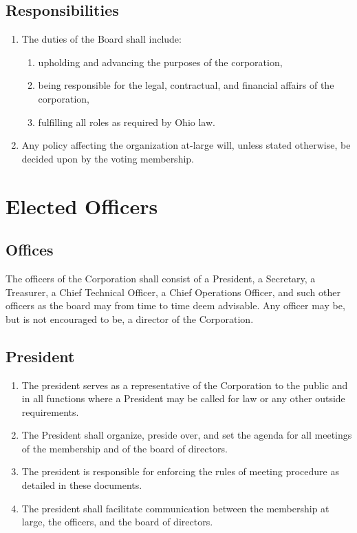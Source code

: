 \documentclass{article}
\begin{document}
\subsection{Responsibilities}
\begin{enumerate}
  \item The duties of the Board shall include:
  \begin{enumerate}
    \item upholding and advancing the purposes of the corporation,
    \item being responsible for the legal, contractual, and financial affairs of
    the corporation,
    \item fulfilling all roles as required by Ohio law.
  \end{enumerate}
  \item Any policy affecting the organization at-large will, unless stated
  otherwise, be decided upon by the voting membership.
\end{enumerate}
\section{Elected Officers}
\subsection{Offices}
The officers of the Corporation shall consist of a President, a Secretary, a Treasurer, a 
Chief Technical Officer, a Chief Operations Officer, and such other officers as the board 
may from time to time deem advisable.  Any officer may be, but is not encouraged to be, a 
director of the Corporation.
\subsection{President}
\begin{enumerate}
  \item The president serves as a representative of the Corporation to the public and in all 
functions where a President may be called for law or any other outside requirements.
  \item The President shall organize, preside over, and set the agenda for all meetings of 
the membership and of the board of directors.
  \item The president is responsible for enforcing the rules of meeting procedure as 
detailed in these documents.
  \item The president shall facilitate communication between the membership at large, the 
officers, and the board of directors.
\end{enumerate}
\end{document}
